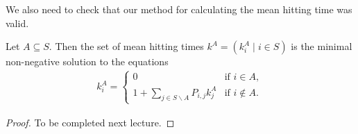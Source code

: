 \documentclass[a4paper]{scrartcl}
\begin{document}
We also need to check that our method for calculating the mean hitting time was valid.

\begin{theorem}
	Let $A \subseteq S$. Then the set of mean hitting times $k^A = (k_i^A \mid i \in S)$ is the minimal non-negative solution to the equations
	\begin{align*}
		k_i^A = \begin{cases}
			0 &\mbox{if } i  \in A, \\
			1 + \sum_{j \in S\backslash A} P_{i, j} k_j^A &\mbox{if } i \not \in A.
		   \end{cases}
	\end{align*}
\end{theorem}
\begin{proof}
	To be completed next lecture.
\end{proof}
\end{document}
